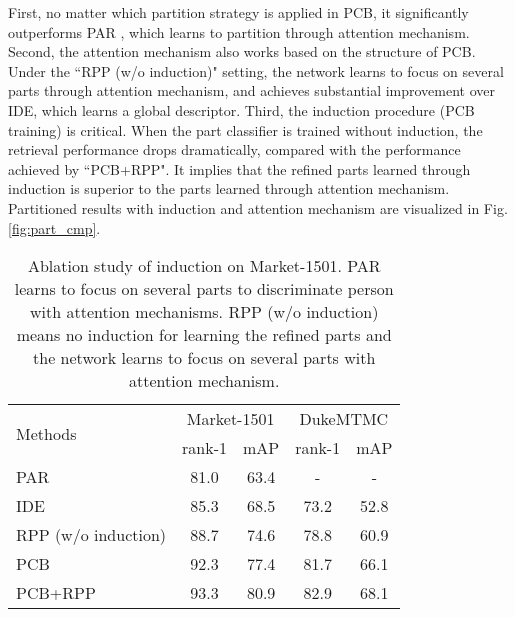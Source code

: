 \documentclass[10pt,twocolumn,letterpaper]{article}
\begin{document}
First, no matter which partition strategy is applied in PCB, it significantly outperforms PAR \cite{Zhao2017Deeply}, which learns to partition through attention mechanism. Second, the attention mechanism also works based on the structure of PCB. Under the ``RPP (w/o induction)" setting, the network learns to focus on several parts through attention mechanism, and achieves substantial improvement over IDE, which learns a global descriptor. Third, the induction procedure (PCB training) is critical. When the part classifier is trained without induction, the retrieval performance drops dramatically, compared with the performance achieved by ``PCB+RPP". It implies that the refined parts learned through induction is superior to the parts learned through attention mechanism.
Partitioned results with induction and attention mechanism are visualized in Fig. \ref{fig:part_cmp}.
\setlength{\tabcolsep}{2.9pt}
\begin{table}
\begin{center}
\begin{tabular}{l|cc|cc}
\hline
\multicolumn{1}{l|}{\multirow{2}{*}{Methods}}&\multicolumn{2}{c|}{Market-1501}&\multicolumn{2}{c}{DukeMTMC}\\
\cline{2-5}
\multicolumn{1}{c|}{}&rank-1&mAP&rank-1&mAP\\
\hline
PAR\cite{Zhao2017Deeply}   &81.0&63.4   &-&-\\
IDE   &85.3 & 68.5   & 73.2 &52.8\\

RPP (w/o induction) &88.7&74.6  &78.8&60.9 \\

PCB &92.3&77.4  &81.7&66.1 \\

PCB+RPP  &93.3&80.9  &82.9&68.1 \\
\hline
\end{tabular}
\end{center}
\setlength{\abovecaptionskip}{0cm}
\caption{Ablation study of induction on Market-1501. PAR learns to focus on several parts to discriminate person with attention mechanisms. RPP (w/o induction) means no induction for learning the refined parts and the network learns to focus on several parts with attention mechanism.}
\label{tab:cmp_with_attention}
\end{table}
\end{document}
